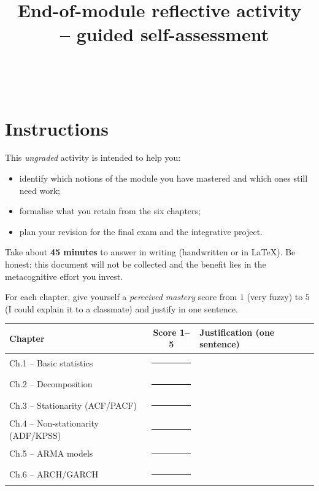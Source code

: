 \documentclass[a4paper,11pt]{article}
\title{End-of-module reflective activity\\
\large \moduleNom\ -- guided self-assessment}
\author{\auteurNom\\\auteurEmail\\\auteurInstitution}
\date{\anneeUniversitaire}
\begin{document}
\maketitle

\section*{Instructions}

This \emph{ungraded} activity is intended to help you:
\begin{itemize}
  \item identify which notions of the module you have mastered and
        which ones still need work;
  \item formalise what you retain from the six chapters;
  \item plan your revision for the final exam and the integrative
        project.
\end{itemize}

\noindent
Take about \textbf{45 minutes} to answer in writing (handwritten or
in LaTeX). Be honest: this document will not be collected and the
benefit lies in the metacognitive effort you invest.

\begin{question}
For each chapter, give yourself a \emph{perceived mastery} score
from $1$ (very fuzzy) to $5$ (I could explain it to a classmate)
and justify in one sentence.

\medskip
\begin{tabular}{lcl}
\toprule
\textbf{Chapter} & \textbf{Score 1--5} & \textbf{Justification (one sentence)} \\
\midrule
Ch.1 -- Basic statistics       & \rule{1cm}{0.4pt} & \dotfill \\
Ch.2 -- Decomposition          & \rule{1cm}{0.4pt} & \dotfill \\
Ch.3 -- Stationarity (ACF/PACF) & \rule{1cm}{0.4pt} & \dotfill \\
Ch.4 -- Non-stationarity (ADF/KPSS) & \rule{1cm}{0.4pt} & \dotfill \\
Ch.5 -- ARMA models            & \rule{1cm}{0.4pt} & \dotfill \\
Ch.6 -- ARCH/GARCH             & \rule{1cm}{0.4pt} & \dotfill \\
\bottomrule
\end{tabular}
\end{question}
\end{document}
